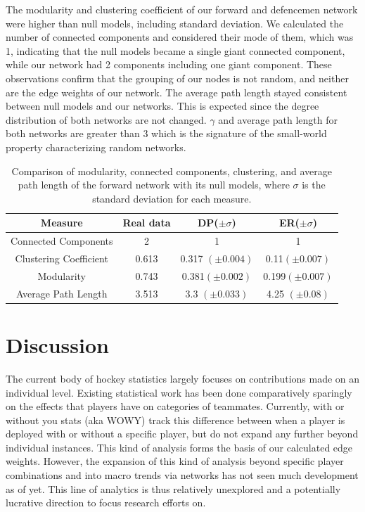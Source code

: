 \documentclass{article}
\begin{document}
The modularity and clustering coefficient of our forward and defencemen network were higher than null models, including standard deviation. We calculated the number of connected components and considered their mode of them, which was 1, indicating that the null models became a single giant connected component, while our network had 2 components including one giant component. These observations confirm that the grouping of our nodes is not random, and neither are the edge weights of our network. The average path length stayed consistent between null models and our networks. This is expected since the degree distribution of both networks are not changed. $ {\gamma}$ and average path length for both networks are greater than 3 which is the signature of the small-world property characterizing random networks. 
\begin{table}[H]
\centering %

\begin{tabular}{cccc}
\hline
Measure & Real data & DP($\pm \sigma$) & ER($\pm \sigma$)\\
\hline
Connected Components &  2 & 1 & 1\\
Clustering Coefficient & 0.613 & 0.317 $(\pm0.004)$ & 0.11$(\pm0.007)$\\
Modularity & 0.743 & 0.381$(\pm0.002)$ & 0.199$(\pm0.007)$\\
Average Path Length & 3.513 & 3.3 $(\pm0.033)$ & 4.25 $(\pm0.08)$ \\
\hline
\end{tabular}
\caption{Comparison of modularity, connected components, clustering, and average path length of the forward network with its null models, where $\sigma$ is the standard deviation for each measure.}\label{tab3}
\end{table}


\section{Discussion}
The current body of hockey statistics largely focuses on contributions made on an individual level.
Existing statistical work has been done comparatively sparingly on the effects that players have on categories of teammates.
Currently, with or without you stats (aka WOWY) track this difference between when a player is deployed with or without a specific player, but do not expand any further beyond individual instances.
This kind of analysis forms the basis of our calculated edge weights.
However, the expansion of this kind of analysis beyond specific player combinations and into macro trends via networks has not seen much development as of yet.
This line of analytics is thus relatively unexplored and a potentially lucrative direction to focus research efforts on.
\end{document}
